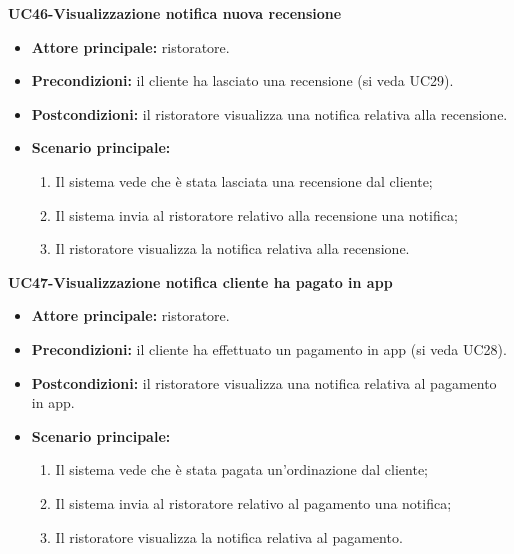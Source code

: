 \textbf{UC46-Visualizzazione notifica nuova recensione}
\begin{itemize}
\item \textbf{Attore principale:} ristoratore.
\item \textbf{Precondizioni:} il cliente ha lasciato una recensione (si veda UC29).
\item \textbf{Postcondizioni:} il ristoratore visualizza una notifica relativa alla recensione.
\item \textbf{Scenario principale:}
\begin{enumerate}
    \item Il sistema vede che è stata lasciata una recensione dal cliente;
    \item Il sistema invia al ristoratore relativo alla recensione una notifica;
    \item Il ristoratore visualizza la notifica relativa alla recensione.
\end{enumerate}
\end{itemize}

\textbf{UC47-Visualizzazione notifica cliente ha pagato in app}
\begin{itemize}
\item \textbf{Attore principale:} ristoratore.
\item \textbf{Precondizioni:} il cliente ha effettuato un pagamento in app (si veda UC28).
\item \textbf{Postcondizioni:} il ristoratore visualizza una notifica relativa al pagamento in app.
\item \textbf{Scenario principale:}
\begin{enumerate}
    \item Il sistema vede che è stata pagata un'ordinazione dal cliente;
    \item Il sistema invia al ristoratore relativo al pagamento una notifica;
    \item Il ristoratore visualizza la notifica relativa al pagamento.
\end{enumerate}
\end{itemize}

